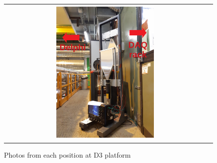 \begin{figure}[h]
\begin{center}
\begin{tabular}[t]{cc}
      \includegraphics[width=0.5\textwidth]{figs/INT/D3_front.pdf} \\
    \end{tabular}
  \end{center}
\caption{
    Photos from each position at D3 platform
}
\end{figure}
